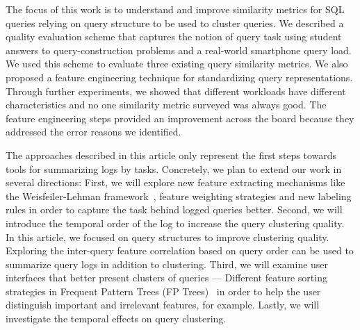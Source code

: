 The focus of this work is to understand and improve similarity metrics for SQL queries relying on query structure to be used to cluster queries. 
We described a quality evaluation scheme that captures the notion of query task using student answers to query-construction problems and a real-world smartphone query load.
We used this scheme to evaluate three existing query similarity metrics.
We also proposed a feature engineering technique for standardizing query representations.
Through further experiments, we showed that different workloads have different characteristics and no one similarity metric surveyed was always good. 
The feature engineering steps provided an improvement across the board because they addressed the error reasons we identified. 

The approaches described in this article only represent the first steps towards tools for summarizing logs by tasks.
Concretely, we plan to extend our work in several directions:
First, we will explore new feature extracting mechanisms like the Weisfeiler-Lehman framework~\cite{kul2016ettu}, feature weighting strategies and new labeling rules in order to capture the task behind logged queries better.
Second, we will introduce the temporal order of the log to increase the query clustering quality. In this article, we focused on query structures to improve clustering quality. Exploring the inter-query feature correlation based on query order can be used to summarize query logs in addition to clustering.
Third, we will examine user interfaces that better present clusters of queries --- Different feature sorting strategies in Frequent Pattern Trees (FP Trees)~\cite{han2004mining} in order to help the user distinguish important and irrelevant features, for example.
Lastly, we will investigate the temporal effects on query clustering. 
